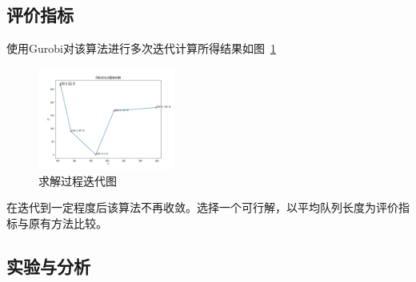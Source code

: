 
\subsection{评价指标}
使用Gurobi对该算法进行多次迭代计算所得结果如图~\ref{fig44}~
\begin{figure}[htbp!]
    \centering
    \includegraphics[width=0.4\textwidth]{figs/chap04/myplot.png}
    \caption{求解过程迭代图}
    \label{fig44}
\end{figure}

在迭代到一定程度后该算法不再收敛。选择一个可行解，以平均队列长度为评价指标与原有方法比较。

\subsection{实验与分析}



